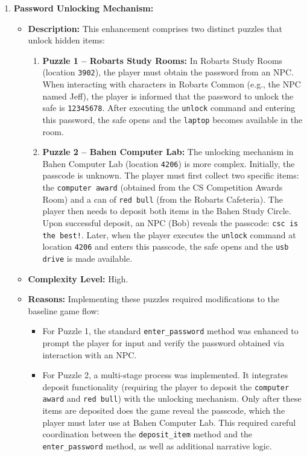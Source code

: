 \documentclass[11pt]{article}
\begin{document}
\begin{enumerate}
    \item \textbf{Password Unlocking Mechanism:}
    \begin{itemize}
        \item \textbf{Description:}  
        This enhancement comprises two distinct puzzles that unlock hidden items:
        \begin{enumerate}
            \item \textbf{Puzzle 1 – Robarts Study Rooms:}  
            In Robarts Study Rooms (location \texttt{3902}), the player must obtain the password from an NPC. When interacting with characters in Robarts Common (e.g., the NPC named Jeff), the player is informed that the password to unlock the safe is \texttt{12345678}. After executing the \texttt{unlock} command and entering this password, the safe opens and the \texttt{laptop} becomes available in the room.
            \item \textbf{Puzzle 2 – Bahen Computer Lab:}  
            The unlocking mechanism in Bahen Computer Lab (location \texttt{4206}) is more complex. Initially, the passcode is unknown. The player must first collect two specific items: the \texttt{computer award} (obtained from the CS Competition Awards Room) and a can of \texttt{red bull} (from the Robarts Cafeteria). The player then needs to deposit both items in the Bahen Study Circle. Upon successful deposit, an NPC (Bob) reveals the passcode: \texttt{csc is the best!}. Later, when the player executes the \texttt{unlock} command at location \texttt{4206} and enters this passcode, the safe opens and the \texttt{usb drive} is made available.
        \end{enumerate}
        \item \textbf{Complexity Level:} High.
        \item \textbf{Reasons:}  
        Implementing these puzzles required modifications to the baseline game flow:
        \begin{itemize}
            \item For Puzzle 1, the standard \texttt{enter\_password} method was enhanced to prompt the player for input and verify the password obtained via interaction with an NPC.
            \item For Puzzle 2, a multi-stage process was implemented. It integrates deposit functionality (requiring the player to deposit the \texttt{computer award} and \texttt{red bull}) with the unlocking mechanism. Only after these items are deposited does the game reveal the passcode, which the player must later use at Bahen Computer Lab. This required careful coordination between the \texttt{deposit\_item} method and the \texttt{enter\_password} method, as well as additional narrative logic.

\end{itemize}
\end{itemize}
\end{enumerate}
\end{document}
